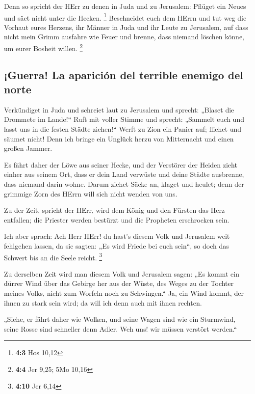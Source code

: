  Denn so spricht der HErr zu denen in Juda und zu
Jerusalem: Pflüget ein Neues und säet nicht unter die Hecken.
\footnote{\textbf{4:3} Hos 10,12}  Beschneidet euch dem
HErrn und tut weg die Vorhaut eures Herzens, ihr Männer in Juda und ihr
Leute zu Jerusalem, auf dass nicht mein Grimm ausfahre wie Feuer und
brenne, dass niemand löschen könne, um eurer Bosheit willen. \footnote{\textbf{4:4}
  Jer 9,25; 5Mo 10,16}

\hypertarget{guerra-la-apariciuxf3n-del-terrible-enemigo-del-norte}{%
\subsection{¡Guerra! La aparición del terrible enemigo del
norte}\label{guerra-la-apariciuxf3n-del-terrible-enemigo-del-norte}}

 Verkündiget in Juda und schreiet laut zu Jerusalem und
sprecht: „Blaset die Drommete im Lande!{}`` Ruft mit voller Stimme und
sprecht: „Sammelt euch und lasst uns in die festen Städte ziehen!{}``
 Werft zu Zion ein Panier auf; fliehet und säumet nicht!
Denn ich bringe ein Unglück herzu von Mitternacht und einen großen
Jammer.

 Es fährt daher der Löwe aus seiner Hecke, und der
Verstörer der Heiden zieht einher aus seinem Ort, dass er dein Land
verwüste und deine Städte ausbrenne, dass niemand darin wohne.
 Darum ziehet Säcke an, klaget und heulet; denn der
grimmige Zorn des HErrn will sich nicht wenden von uns.

 Zu der Zeit, spricht der HErr, wird dem König und den
Fürsten das Herz entfallen; die Priester werden bestürzt und die
Propheten erschrocken sein.

 Ich aber sprach: Ach Herr HErr! du hast's diesem Volk
und Jerusalem weit fehlgehen lassen, da sie sagten: „Es wird Friede bei
euch sein``, so doch das Schwert bis an die Seele reicht. \footnote{\textbf{4:10}
  Jer 6,14}

 Zu derselben Zeit wird man diesem Volk und Jerusalem
sagen: „Es kommt ein dürrer Wind über das Gebirge her aus der Wüste, des
Weges zu der Tochter meines Volks, nicht zum Worfeln noch zu
Schwingen.``  Ja, ein Wind kommt, der ihnen zu stark sein
wird; da will ich denn auch mit ihnen rechten.

 „Siehe, er fährt daher wie Wolken, und seine Wagen sind
wie ein Sturmwind, seine Rosse sind schneller denn Adler. Weh uns! wir
müssen verstört werden.``

